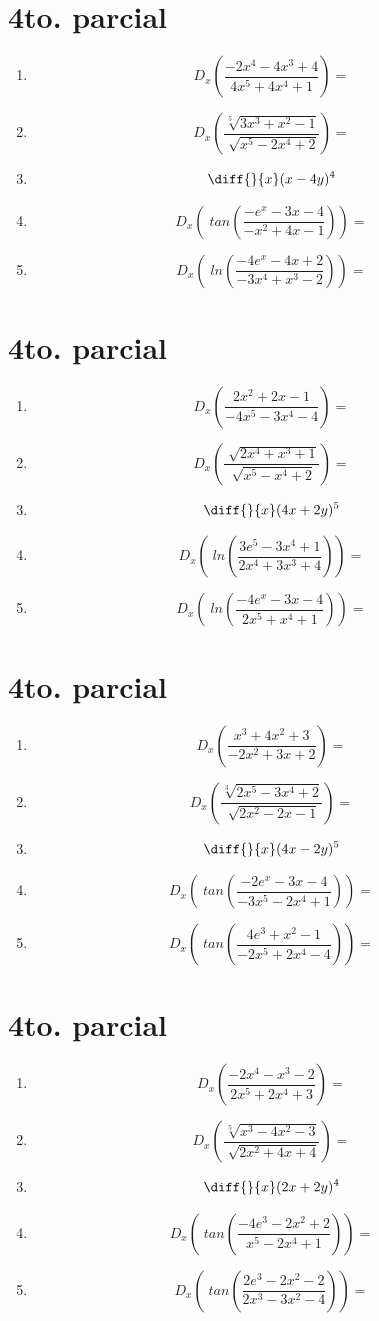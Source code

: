 \documentclass[oneside,spanish,letter]{article}
\begin{document}
\section{4to. parcial}
\begin{enumerate}
 \item $$ D_x \left( \frac{-2x^4-4x^3+4}{4x^5+4x^4+1}\right)=$$
 \item $$ D_x \left( \frac{\sqrt[5]{3x^3+x^2-1}}{\sqrt[]{x^5-2x^4+2}}\right)=$$
\item $$\diff{}{x}(x-4y)^4$$
 \item $$ D_x \left(\;tan\left( \frac{-e^x-3x-4}{-x^2+4x-1}\right)\right)=$$
 \item $$ D_x \left(\;ln\left( \frac{-4e^x-4x+2}{-3x^4+x^3-2}\right)\right)=$$
 \end{enumerate}
  \newpage
\section{4to. parcial}
\begin{enumerate}
 \item $$ D_x \left( \frac{2x^2+2x-1}{-4x^5-3x^4-4}\right)=$$
 \item $$ D_x \left( \frac{\sqrt[]{2x^4+x^3+1}}{\sqrt[]{x^5-x^4+2}}\right)=$$
\item $$\diff{}{x}(4x+2y)^5$$
 \item $$ D_x \left(\;ln\left( \frac{3e^5-3x^4+1}{2x^4+3x^3+4}\right)\right)=$$
 \item $$ D_x \left(\;ln\left( \frac{-4e^x-3x-4}{2x^5+x^4+1}\right)\right)=$$
 \end{enumerate}
  \newpage
\section{4to. parcial}
\begin{enumerate}
 \item $$ D_x \left( \frac{x^3+4x^2+3}{-2x^2+3x+2}\right)=$$
 \item $$ D_x \left( \frac{\sqrt[3]{2x^5-3x^4+2}}{\sqrt[]{2x^2-2x-1}}\right)=$$
\item $$\diff{}{x}(4x-2y)^5$$
 \item $$ D_x \left(\;tan\left( \frac{-2e^x-3x-4}{-3x^5-2x^4+1}\right)\right)=$$
 \item $$ D_x \left(\;tan\left( \frac{4e^3+x^2-1}{-2x^5+2x^4-4}\right)\right)=$$
 \end{enumerate}
  \newpage
\section{4to. parcial}
\begin{enumerate}
 \item $$ D_x \left( \frac{-2x^4-x^3-2}{2x^5+2x^4+3}\right)=$$
 \item $$ D_x \left( \frac{\sqrt[5]{x^3-4x^2-3}}{\sqrt[]{2x^2+4x+4}}\right)=$$
\item $$\diff{}{x}(2x+2y)^4$$
 \item $$ D_x \left(\;tan\left( \frac{-4e^3-2x^2+2}{x^5-2x^4+1}\right)\right)=$$
 \item $$ D_x \left(\;tan\left( \frac{2e^3-2x^2-2}{2x^3-3x^2-4}\right)\right)=$$
 \end{enumerate}
  \newpage
\end{document}
